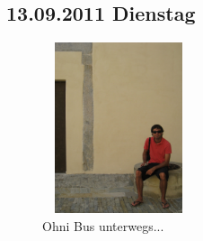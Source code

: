 \subsection{13.09.2011 Dienstag}

\begin{figure} 
  \begin{centering}
    \includegraphics[width=0.4\textwidth, height=5cm, keepaspectratio]{../Bilder/Korsika/52.jpg}
    \caption{Ohni Bus unterwegs...}
  \end{centering}
\end{figure} 

